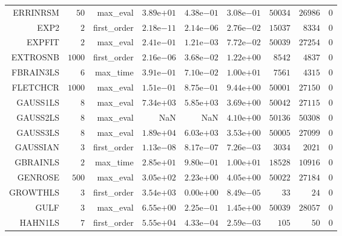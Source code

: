 \begin{longtable}{rrrrrrrrr}
ERRINRSM & \(    50\) & max\_eval & \( 3.89\)e\(+01\) & \( 4.38\)e\(-01\) & \( 3.08\)e\(-01\) & \( 50034\) & \( 26986\) & \(     0\) \\
EXP2 & \(     2\) & first\_order & \( 2.18\)e\(-11\) & \( 2.14\)e\(-06\) & \( 2.76\)e\(-02\) & \( 15037\) & \(  8334\) & \(     0\) \\
EXPFIT & \(     2\) & max\_eval & \( 2.41\)e\(-01\) & \( 1.21\)e\(-03\) & \( 7.72\)e\(-02\) & \( 50039\) & \( 27254\) & \(     0\) \\
EXTROSNB & \(  1000\) & first\_order & \( 2.16\)e\(-06\) & \( 3.68\)e\(-02\) & \( 1.22\)e\(+00\) & \(  8542\) & \(  4837\) & \(     0\) \\
FBRAIN3LS & \(     6\) & max\_time & \( 3.91\)e\(-01\) & \( 7.10\)e\(-02\) & \( 1.00\)e\(+01\) & \(  7561\) & \(  4315\) & \(     0\) \\
FLETCHCR & \(  1000\) & max\_eval & \( 1.51\)e\(-01\) & \( 8.75\)e\(-01\) & \( 9.44\)e\(+00\) & \( 50001\) & \( 27150\) & \(     0\) \\
GAUSS1LS & \(     8\) & max\_eval & \( 7.34\)e\(+03\) & \( 5.85\)e\(+03\) & \( 3.69\)e\(+00\) & \( 50042\) & \( 27115\) & \(     0\) \\
GAUSS2LS & \(     8\) & max\_eval &       NaN &       NaN & \( 4.10\)e\(+00\) & \( 50136\) & \( 50308\) & \(     0\) \\
GAUSS3LS & \(     8\) & max\_eval & \( 1.89\)e\(+04\) & \( 6.03\)e\(+03\) & \( 3.53\)e\(+00\) & \( 50005\) & \( 27099\) & \(     0\) \\
GAUSSIAN & \(     3\) & first\_order & \( 1.13\)e\(-08\) & \( 8.17\)e\(-07\) & \( 7.26\)e\(-03\) & \(  3034\) & \(  2021\) & \(     0\) \\
GBRAINLS & \(     2\) & max\_time & \( 2.85\)e\(+01\) & \( 9.80\)e\(-01\) & \( 1.00\)e\(+01\) & \( 18528\) & \( 10916\) & \(     0\) \\
GENROSE & \(   500\) & max\_eval & \( 3.05\)e\(+02\) & \( 2.23\)e\(+00\) & \( 4.05\)e\(+00\) & \( 50022\) & \( 27184\) & \(     0\) \\
GROWTHLS & \(     3\) & first\_order & \( 3.54\)e\(+03\) & \( 0.00\)e\(+00\) & \( 8.49\)e\(-05\) & \(    33\) & \(    24\) & \(     0\) \\
GULF & \(     3\) & max\_eval & \( 6.55\)e\(+00\) & \( 2.25\)e\(-01\) & \( 1.45\)e\(+00\) & \( 50039\) & \( 28057\) & \(     0\) \\
HAHN1LS & \(     7\) & first\_order & \( 5.55\)e\(+04\) & \( 4.33\)e\(-04\) & \( 2.59\)e\(-03\) & \(   105\) & \(    50\) & \(     0\) \\

\end{longtable}
